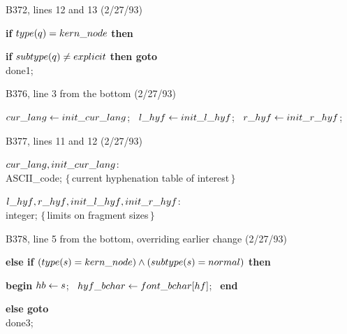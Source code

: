 \bugonpage B372, lines 12 and 13 (2/27/93)

\ninepoint\noindent\hskip20pt
{\bf if\/} $\\{type}(q)=\\{kern\_node}$ {\bf then}\par\noindent\hskip30pt
{\bf if\/} $\\{subtype}(q)\ne\\{explicit}$ {\bf then goto} \\{done1};

\bugonpage B376, line 3 from the bottom (2/27/93)

\ninepoint\noindent\hskip10pt
$\\{cur\_lang}\gets\\{init\_cur\_lang}$; \
$\\{l\_hyf}\gets\\{init\_l\_hyf}$; \
$\\{r\_hyf}\gets\\{init\_r\_hyf}$;

\bugonpage B377, lines 11 and 12 (2/27/93)

\ninepoint\noindent
$\\{cur\_lang},\\{init\_cur\_lang}$: \\{ASCII\_code};\quad
 $\{\,$current hyphenation table of interest$\,\}$\par\noindent
$\\{l\_hyf},\\{r\_hyf},\\{init\_l\_hyf},\\{init\_r\_hyf}$: \\{integer};\quad
 $\{\,$limits on fragment sizes$\,\}$

\bugonpage B378, line 5 from the bottom, overriding earlier change (2/27/93)

\ninepoint\noindent\hskip30pt
{\bf else if} $(\\{type}(s)=\\{kern\_node})\land(\\{subtype}(s)=\\{normal})$
 {\bf then}\par\noindent\hskip50pt
{\bf begin} $\\{hb}\gets s$; \ $\\{hyf\_bchar}\gets\\{font\_bchar}[\\{hf}]$; \
 {\bf end}\par\noindent\hskip40pt
{\bf else goto} \\{done3};


